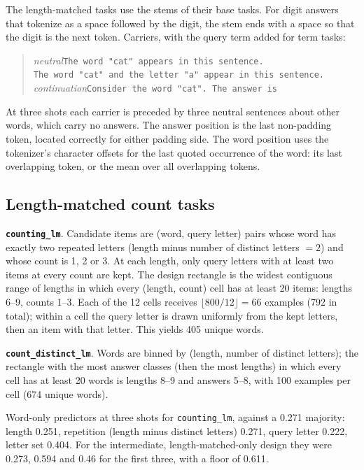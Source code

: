 The length-matched tasks use the stems of their base tasks. For digit answers that tokenize as a space
followed by the digit, the stem ends with a space so that the digit is the next token. Carriers, with
the query term added for term tasks:

\begin{quote}\footnotesize
\emph{neutral}\quad\texttt{The word "cat" appears in this sentence.}\\
\quad\texttt{The word "cat" and the letter "a" appear in this sentence.}\\
\emph{continuation}\quad\texttt{Consider the word "cat". The answer is}
\end{quote}

At three shots each carrier is preceded by three neutral sentences about other words, which carry no
answers. The answer position is the last non-padding token, located correctly for either padding
side. The word position uses the tokenizer's character offsets for the last quoted occurrence of the
word: its last overlapping token, or the mean over all overlapping tokens.

\subsection{Length-matched count tasks}
\label{app:lm}
\textbf{\texttt{counting\_lm}}. Candidate items are (word, query letter) pairs whose word has exactly
two repeated letters (length minus number of distinct letters $= 2$) and whose count is 1, 2 or 3. At
each length, only query letters with at least two items at every count are kept. The design rectangle
is the widest contiguous range of lengths in which every (length, count) cell has at least 20 items:
lengths 6--9, counts 1--3. Each of the 12 cells receives $\lfloor 800/12 \rfloor = 66$ examples (792
in total); within a cell the query letter is drawn uniformly from the kept letters, then an item with
that letter. This yields 405 unique words.

\textbf{\texttt{count\_distinct\_lm}}. Words are binned by (length, number of distinct letters); the
rectangle with the most answer classes (then the most lengths) in which every cell has at least 20
words is lengths 8--9 and answers 5--8, with 100 examples per cell (674 unique words).

Word-only predictors at three shots for \texttt{counting\_lm}, against a 0.271 majority: length 0.251,
repetition (length minus distinct letters) 0.271, query letter 0.222, letter set 0.404. For the intermediate,
length-matched-only design they were 0.273, 0.594 and 0.46 for the first three, with a floor of 0.611.

